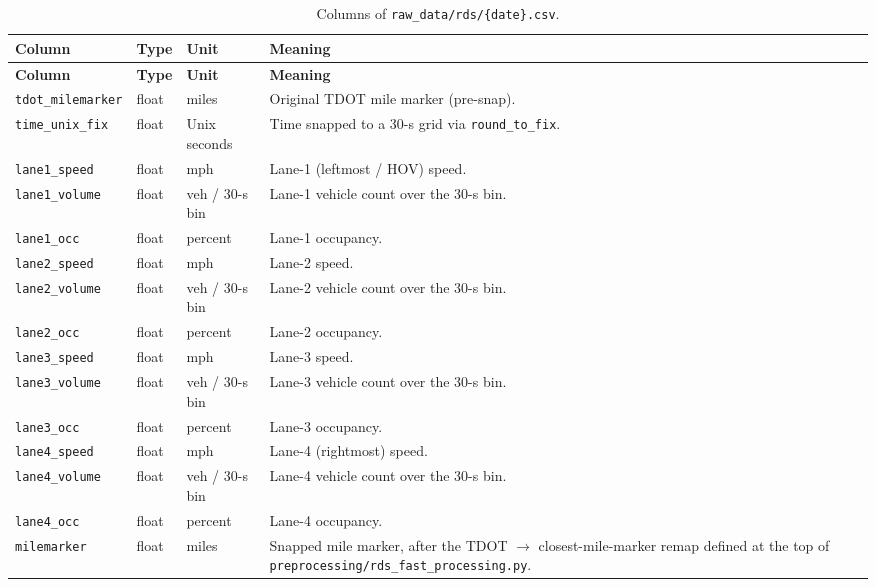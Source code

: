 \documentclass[11pt]{article}
\newcommand{\code}[1]{\texttt{#1}}
\begin{document}
\begin{longtable}{L{3.2cm} L{1.0cm} L{2.4cm} L{8.6cm}}
\caption{Columns of \code{raw\_data/rds/\{date\}.csv}.}
\label{tab:rds-raw-data}\\
\toprule
\textbf{Column} & \textbf{Type} & \textbf{Unit} & \textbf{Meaning} \\
\midrule
\endfirsthead
\toprule
\textbf{Column} & \textbf{Type} & \textbf{Unit} & \textbf{Meaning} \\
\midrule
\endhead
\code{tdot\_milemarker}      & float & miles            & Original TDOT mile marker (pre-snap). \\
\code{time\_unix\_fix}       & float & Unix seconds     & Time snapped to a 30-s grid via \code{round\_to\_fix}. \\
\code{lane1\_speed}          & float & mph              & Lane-1 (leftmost / HOV) speed. \\
\code{lane1\_volume}         & float & veh / 30-s bin   & Lane-1 vehicle count over the 30-s bin. \\
\code{lane1\_occ}            & float & percent          & Lane-1 occupancy. \\
\code{lane2\_speed}          & float & mph              & Lane-2 speed. \\
\code{lane2\_volume}         & float & veh / 30-s bin   & Lane-2 vehicle count over the 30-s bin. \\
\code{lane2\_occ}            & float & percent          & Lane-2 occupancy. \\
\code{lane3\_speed}          & float & mph              & Lane-3 speed. \\
\code{lane3\_volume}         & float & veh / 30-s bin   & Lane-3 vehicle count over the 30-s bin. \\
\code{lane3\_occ}            & float & percent          & Lane-3 occupancy. \\
\code{lane4\_speed}          & float & mph              & Lane-4 (rightmost) speed. \\
\code{lane4\_volume}         & float & veh / 30-s bin   & Lane-4 vehicle count over the 30-s bin. \\
\code{lane4\_occ}            & float & percent          & Lane-4 occupancy. \\
\code{milemarker}            & float & miles            & Snapped mile marker, after the TDOT $\to$ closest-mile-marker remap defined at the top of \code{preprocessing/rds\_fast\_processing.py}. \\
\bottomrule
\end{longtable}
\end{document}

